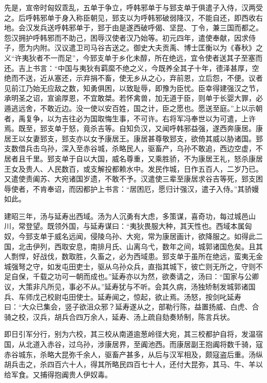 \documentclass[12pt,UTF8]{ctexbook}
\begin{document}
先是，宣帝时匈奴乖乱，五单于争立，呼韩邪单于与郅支单于俱遣子入侍，汉两受之。后呼韩邪单于身入称臣朝见，郅支以为呼韩邪破弱降汉，不能自还，即西收右地。会汉发兵送呼韩邪单于，郅于由是遂西破呼偈、坚昆、丁令，兼三国而都之。怨汉拥护呼韩邪而不助己，困辱汉使者汉乃始等。初元四年，遣使奉献，因求侍子，愿为内附。汉议遣卫司马谷吉送之。御史大夫贡禹、博士匡衡以为《春秋》之义“许夷狄者不一而足”，今郅支单于乡化未醇，所在绝远，宜令使者送其子至塞而还。吉上书言：“中国与夷狄有羁縻不绝之义，今既养全其子十年，德泽甚厚，空绝而不送，近从塞还，示弃捐不畜，使无乡从之心，弃前恩，立后怨，不便。议者见前江乃始无应敌之数，知勇俱困，以致耻辱，即豫为臣忧。臣幸得建强汉之节，承明圣之诏，宣谕厚恩，不宜敢桀。若怀禽兽，加无道于臣，则单于长婴大罪，必遁逃远舍，不敢近边。没一使以安百姓，国之计，臣之愿也。愿送至庭。”上以示朝者，禹复争，以为吉往必为国取悔生事，不可许。右将军冯奉世以为可遣，上许焉。既至，郅支单于怒，竟杀吉等。自知负汉，又闻呼韩邪益强，遂西奔康居。康居王以女妻郅支，郅支亦以女予康居王。康居甚尊敬郅支，欲倚其威以胁诸国。郅支数借兵击乌孙，深入至赤谷城，杀略民人，驱畜产，乌孙不敢追，西边空虚，不居者且千里。郅支单于自以大国，威名尊重，又乘胜骄，不为康居王礼，怒杀康居王女及贵人、人民数百，或支解投都赖水中。发民作城，日作五百人，二岁乃已。又遣使责阖苏、大宛诸国岁遗，不敢不予。汉遣使三辈至康居求谷吉等死，郅支困辱使者，不肯奉诏，而因都护上书言：“居困厄，愿归计强汉，遣子入侍。”其骄嫚如此。



建昭三年，汤与延寿出西域。汤为人沉勇有大虑，多策谋，喜奇功，每过城邑山川，常登望。既领外国，与延寿谋曰：“夷狄畏服大种，其天性也。西域本属匈奴，今郅支单于威名远闻，侵陵乌孙、大宛，常为康居画计，欲降服之。如得此二国，北击伊列，西取安息，南排月氏、山离乌弋，数年之间，城郭诸国危矣。且其人剽悍，好战伐，数取胜，久畜之，必为西域患。郅支单于虽所在绝远，蛮夷无金城强弩之守，如发屯田吏士，驱从乌孙众兵，直指其城下，彼亡则无所之，守则不足自保，千载之功可一朝而成也。”延寿亦以为然，欲奏请之，汤曰：“国家与公卿议，大策非凡所见，事必不从。”延寿犹与不听。会其久病，汤独矫制发城郭诸国兵、车师戊己校尉屯田使士。延寿闻之，惊起，欲止焉。汤怒，按剑叱延寿曰：“大众已集会，竖子欲沮众邪？延寿遂从之，部勒行陈，益置扬威、白虎、合骑之校，汉兵，胡兵合四万余人，延寿、汤上疏自劾奏矫制，陈言兵状。



即日引军分行，别为六校，其三校从南道逾葱岭径大宛，其三校都护自将，发温宿国，从北道入赤谷，过乌孙，涉康居界，至阗池西。而康居副王抱阗将数千骑，寇赤谷城东，杀略大昆弥千余人，驱畜产甚多，从后与汉军相及，颇寇盗后重。汤纵胡兵击之，杀四百六十人，得其所略民四百七十人，还付大昆弥，其马、牛、羊以给军食。又捕得抱阗贵人伊奴毒。
\end{document}
